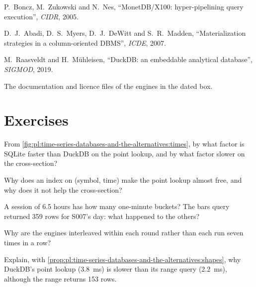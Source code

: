 \begin{omsources}
\item P.~Boncz, M.~Zukowski and N.~Nes, ``MonetDB/X100: hyper-pipelining query execution'', \emph{CIDR}, 2005.
\item D.~J.~Abadi, D.~S.~Myers, D.~J.~DeWitt and S.~R.~Madden, ``Materialization strategies in a column-oriented DBMS'',
\emph{ICDE}, 2007.
\item M.~Raasveldt and H.~Mühleisen, ``DuckDB: an embeddable analytical database'', \emph{SIGMOD}, 2019.
\item The documentation and licence files of the engines in the dated box.
\end{omsources}

\section{Exercises}

\begin{exercise}[$\star$]\label{exo:pl:time-series-databases-and-the-alternatives:1}
From \cref{fig:pl:time-series-databases-and-the-alternatives:times}, by what factor is SQLite faster than DuckDB on the point
lookup, and by what factor slower on the cross-section?
\end{exercise}

\begin{exercise}[$\star$]\label{exo:pl:time-series-databases-and-the-alternatives:2}
Why does an index on (symbol, time) make the point lookup almost free, and why does it not help the cross-section?
\end{exercise}

\begin{exercise}[$\star$]\label{exo:pl:time-series-databases-and-the-alternatives:3}
A session of 6.5 hours has how many one-minute buckets? The bars query returned 359 rows for S007's day: what happened to the
others?
\end{exercise}

\begin{exercise}[$\star\star$]\label{exo:pl:time-series-databases-and-the-alternatives:4}
Why are the engines interleaved within each round rather than each run seven times in a row?
\end{exercise}

\begin{exercise}[$\star\star$]\label{exo:pl:time-series-databases-and-the-alternatives:5}
Explain, with \cref{prop:pl:time-series-databases-and-the-alternatives:shapes}, why DuckDB's point lookup (3.8~ms) is slower than
its range query (2.2~ms), although the range returns 153 rows.
\end{exercise}

